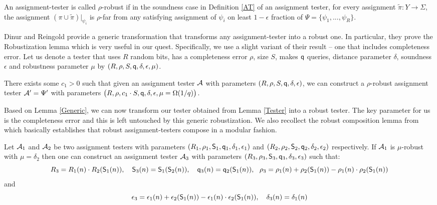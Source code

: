 \begin{definition}\label{RAT}
  An assignment-tester is called $\rho$-robust if in the soundness
  case in Definition \ref{AT} of an assignment tester, for every
  assignment $\tilde{\pi} : Y \rightarrow \Sigma$, the assignment
  $(\pi \cup \tilde{\pi})|_{\psi_i}$ is $\rho$-far from any satisfying
  assignment of $\psi_i$ on least $1 - \epsilon$ fraction of $\Psi =
  \big \{\psi_1, . . . , \psi_R \big\}$.
\end{definition}

Dinur and Reingold \cite{DR} provide a generic transformation that
transforms any assignment-tester into a robust one. In particular,
they prove the Robustization lemma which is very useful in our
quest. Specifically, we use a slight variant of their result -- one
that includes completeness error. Let us denote a tester that uses $R$
random bits, has a completeness error $\rho$, size $S$, makes ${\sf q}$
queries, distance parameter $\delta$, soundness $\epsilon$ and
robustness parameter $\mu$ by $(R, \rho, S, {\sf q}, \delta, \epsilon,
\mu)$.

\begin{lemma}\label{Generic}
  There exists some $c_1 > 0$ such that given an assignment tester
  ${\cal A}$ with parameters $(R, \rho, S, {\sf q}, \delta, \epsilon)$, we
  can construct a $\rho$-robust assignment tester ${\cal A}' = \Psi'$
  with parameters $\left(R, \rho, c_1 \cdot S, {\sf q}, \delta,\epsilon,
    \mu = \Omega(1/q)\right)$.
\end{lemma}

\noindent Based on Lemma \ref{Generic}, we can now transform our
tester obtained from Lemma \ref{Tester} into a robust tester. The key
parameter for us is the completeness error and this is left untouched
by this generic robustization. We also recollect the robust
composition lemma from \cite{DR} which basically establishes that
robust assignment-testers compose in a modular fashion.

\begin{lemma}\label{robust-composition}
  Let ${\cal A}_1$ and ${\cal A}_2$ be two assignment testers with
  parameters $(R_1, \rho_1, {\sf S}_1, {\sf q}_1, \delta_1, \epsilon_1)$ and $(R_2,
  \rho_2, {\sf S}_2, {\sf q}_2, \delta_2, \epsilon_2)$ respectively. If ${\cal A}_1$
  is $\mu$-robust with $\mu = \delta_2$ then one can construct an
  assignment tester ${\cal A}_3$ with parameters $(R_3, \rho_3, {\sf S}_3, {\sf q}_3,
  \delta_3, \epsilon_3)$ such that:
\[
R_3 = R_1(n) \cdot R_2({\sf S}_1(n)), \ \ \ {\sf S}_3(n) = {\sf S}_1({\sf S}_2(n)), \ \ \
{\sf q}_3(n) = {\sf q}_2({\sf S}_1(n)), \ \ \rho_3 = \rho_1(n) + \rho_2({\sf S}_1(n)) - \rho_1(n) \cdot
\rho_2({\sf S}_1(n))\\
\]
and
\[
\epsilon_3 = \epsilon_1(n) + \epsilon_2(\s_1(n)) - \epsilon_1(n) \cdot \epsilon_2(\s_1(n)), \ \ \ \delta_3(n) = \delta_1(n)
\]
\end{lemma}


